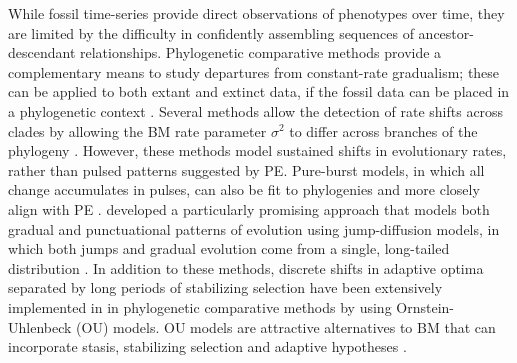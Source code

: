 While fossil time-series provide direct observations of phenotypes over time, they are limited by the difficulty in confidently assembling sequences of ancestor-descendant relationships. Phylogenetic comparative methods provide a complementary means to study departures from constant-rate gradualism; these can be applied to both extant and extinct data, if the fossil data can be placed in a phylogenetic context \citep{PennellHarmon}. Several methods allow the detection of rate shifts across clades by allowing the BM rate parameter $\sigma^2$ to differ across branches of the phylogeny \citep[e.g.,][]{Omeara2006, Eastman2011, Slater2012MECCA}. However, these methods model sustained shifts in evolutionary rates, rather than pulsed patterns suggested by PE. Pure-burst models, in which all change accumulates in pulses, can also be fit to phylogenies and more closely align with PE \citep{HansenMartins1996, Khaitovich2005, Uyeda2011}. \citet{Landis2012} developed a particularly promising approach that models both gradual and punctuational patterns of evolution using jump-diffusion models, in which both jumps and gradual evolution come from a single, long-tailed distribution \citep[see also,][]{Eastmanjump}. In addition to these methods, discrete shifts in adaptive optima separated by long periods of stabilizing selection have been extensively implemented in in phylogenetic comparative methods by using Ornstein-Uhlenbeck (OU) models. OU models are attractive alternatives to BM that can incorporate stasis, stabilizing selection and adaptive hypotheses \citep[][see \textsc{box 1} for further details]{PennellHarmon}. 

